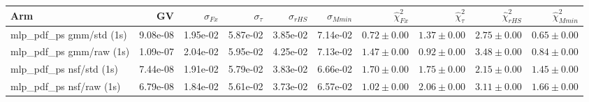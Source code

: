 \begin{tabular}{lrrrrrrrrr}
\toprule
Arm & GV & $\sigma_{Fx}$ & $\sigma_{\tau}$ & $\sigma_{rHS}$ & $\sigma_{Mmin}$ & $\hat\chi^2_{Fx}$ & $\hat\chi^2_{\tau}$ & $\hat\chi^2_{rHS}$ & $\hat\chi^2_{Mmin}$ \\
\midrule
mlp_pdf_ps gmm/std (1s) & 9.08e-08 & 1.95e-02 & 5.87e-02 & 3.85e-02 & 7.14e-02 & $0.72\pm0.00$ & $1.37\pm0.00$ & $2.75\pm0.00$ & $0.65\pm0.00$ \\
mlp_pdf_ps gmm/raw (1s) & 1.09e-07 & 2.04e-02 & 5.95e-02 & 4.25e-02 & 7.13e-02 & $1.47\pm0.00$ & $0.92\pm0.00$ & $3.48\pm0.00$ & $0.84\pm0.00$ \\
mlp_pdf_ps nsf/std (1s) & 7.44e-08 & 1.91e-02 & 5.79e-02 & 3.83e-02 & 6.66e-02 & $1.70\pm0.00$ & $1.75\pm0.00$ & $2.15\pm0.00$ & $1.45\pm0.00$ \\
mlp_pdf_ps nsf/raw (1s) & 6.79e-08 & 1.84e-02 & 5.61e-02 & 3.73e-02 & 6.57e-02 & $1.02\pm0.00$ & $2.06\pm0.00$ & $3.11\pm0.00$ & $1.66\pm0.00$ \\
\bottomrule
\end{tabular}

